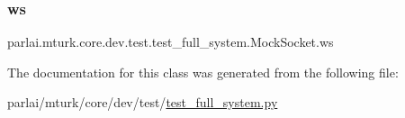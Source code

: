 \subsubsection{\texorpdfstring{ws}{ws}}
{\footnotesize\ttfamily parlai.\+mturk.\+core.\+dev.\+test.\+test\+\_\+full\+\_\+system.\+Mock\+Socket.\+ws}



The documentation for this class was generated from the following file\+:\begin{DoxyCompactItemize}
\item 
parlai/mturk/core/dev/test/\hyperlink{dev_2test_2test__full__system_8py}{test\+\_\+full\+\_\+system.\+py}\end{DoxyCompactItemize}
